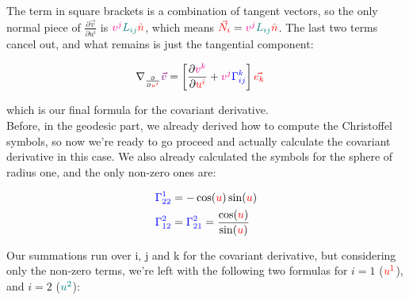 The term in square brackets is a combination of tangent vectors, so the only normal piece of $\frac{\partial \vec{v}}{\partial u^i}$ is
$\begingroup\color{magenta}v^j\endgroup \begingroup\color{teal}L_{ij}\endgroup\begingroup\color{red}\hat{n}\endgroup$, which means $\begingroup\color{red}\vec{N}_i\endgroup = \begingroup\color{magenta}v^j\endgroup \begingroup\color{teal}L_{ij}\endgroup\begingroup\color{red}\hat{n}\endgroup$.
The last two terms cancel out, and what remains is just the tangential component:

\begin{align*}
    \nabla_{\frac{\partial}{\partial \begingroup\color{red}u^i\endgroup}}\begingroup\color{violet}\vec{v}\endgroup 
    &= \left[\frac{\partial \begingroup\color{magenta}v^k\endgroup}{\partial \begingroup\color{red}u^i\endgroup} + \begingroup\color{magenta}v^j\endgroup \begingroup\color{blue}\Gamma^{k}_{ij}\endgroup \right]\begingroup\color{red}\vec{e_k}\endgroup
\end{align*}

which is our final formula for the covariant derivative.\\

Before, in the geodesic part, we already derived how to compute the Christoffel symbols, so now we're ready to go proceed and actually calculate the covariant derivative in this case.
We also already calculated the symbols for the sphere of radius one, and the only non-zero ones are:

\begin{align*}
    \begingroup\color{blue}\Gamma^{1}_{22}\endgroup &= -\cos(\begingroup\color{red}u\endgroup)\sin(\begingroup\color{red}u\endgroup)\\
    \begingroup\color{blue}\Gamma^{2}_{12}\endgroup &= \begingroup\color{blue}\Gamma^{2}_{21}\endgroup = \frac{\cos(\begingroup\color{red}u\endgroup)}{\sin(\begingroup\color{red}u\endgroup)}
\end{align*}

Our summations run over i, j and k for the covariant derivative, but considering only the non-zero terms, we're left with the following two 
formulas for $i=1$ ($\color{red}u^1$), and $i=2$ ($\color{teal}u^2$):


